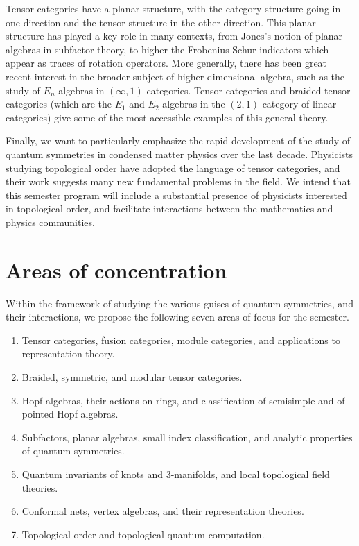 \documentclass[12pt]{article}
\begin{document}
Tensor categories have a planar structure, with the category structure going in one direction and the tensor structure in the other direction. This planar structure has played a key role in many contexts, from Jones's notion of planar algebras in subfactor theory, to higher the Frobenius-Schur indicators which appear as traces of rotation operators. More generally, there has been great recent interest in the broader subject of higher dimensional algebra, such as the study of $E_n$ algebras in $(\infty,1)$-categories. Tensor categories and braided tensor categories (which are the $E_1$ and $E_2$ algebras in the $(2,1)$-category of linear categories) give some of the most accessible examples of this general theory.

Finally, we want to particularly emphasize the rapid development of the study of quantum symmetries in condensed matter physics over the last decade. Physicists studying topological order have adopted the language of tensor categories, and their work suggests many new fundamental problems in the field. We intend that this semester program will include a substantial presence of physicists interested in topological order, and facilitate interactions between the mathematics and physics communities.

\section{Areas of concentration}
Within the framework of studying the various guises of quantum symmetries, and their interactions, we propose the following seven areas of focus for the semester.

\begin{enumerate}
  \setlength{\itemsep}{1pt}
  \setlength{\parskip}{0pt}
  \setlength{\parsep}{0pt}
\item Tensor categories, fusion categories, module categories, and applications to representation theory.
\item Braided, symmetric, and modular tensor categories.
\item Hopf algebras, their actions on rings, and classification of semisimple and of pointed Hopf algebras.
\item Subfactors, planar algebras, small index classification, and analytic properties of quantum symmetries.
\item Quantum invariants of knots and 3-manifolds, and local topological field theories.
\item Conformal nets, vertex algebras, and their representation theories.
\item Topological order and topological quantum computation.
\end{enumerate}
\end{document}
